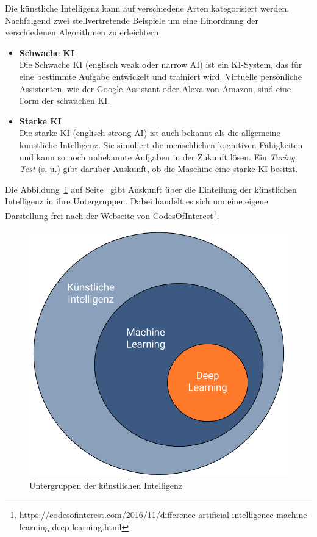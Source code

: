 Die künstliche Intelligenz kann auf verschiedene Arten kategorisiert werden. Nachfolgend zwei stellvertretende Beispiele
um eine Einordnung der verschiedenen Algorithmen zu erleichtern.

\begin{itemize}
    \item \textbf{Schwache KI} \\
    Die Schwache KI (englisch weak oder narrow AI) ist ein KI-System, das für eine bestimmte Aufgabe entwickelt und
    trainiert wird. Virtuelle persönliche Assistenten, wie der Google Assistant oder Alexa von Amazon, sind eine Form
    der schwachen KI.
    \item \textbf{Starke KI} \\
    Die starke KI (englisch strong AI) ist auch bekannt als die allgemeine künstliche Intelligenz. Sie simuliert die
    menschlichen kognitiven Fähigkeiten und kann so noch unbekannte Aufgaben in der Zukunft lösen. Ein
    \textit{Turing Test} (s. u.) gibt darüber Auskunft, ob die Maschine eine starke KI besitzt.
\end{itemize}

Die Abbildung~\ref{fig:grundlagen_artificialintelligence} auf Seite~\pageref{fig:grundlagen_artificialintelligence} gibt
Auskunft über die Einteilung der künstlichen Intelligenz in ihre Untergruppen. Dabei handelt es sich um eine eigene
Darstellung frei nach der Webseite von
CodesOfInterest\footnote{https://codesofinterest.com/2016/11/difference-artificial-intelligence-machine-learning-deep-learning.html}.

\begin{figure}[h]
    \centering
    \includegraphics[scale=0.55]{images/kapitel_2/kuenstliche_intelligenz.pdf}
    \caption{Untergruppen der künstlichen Intelligenz}
    \label{fig:grundlagen_artificialintelligence}
\end{figure}

